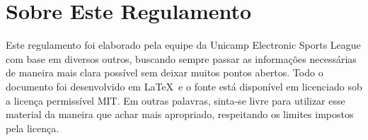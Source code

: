 \section{Sobre Este Regulamento}

Este regulamento foi elaborado pela equipe da Unicamp Electronic Sports League com base em diversos outros, buscando sempre passar as informações necessárias de maneira mais clara possível sem deixar muitos pontos abertos. Todo o documento foi desenvolvido em \LaTeX\ e o fonte está disponível em  licenciado sob a licença permissível MIT. Em outras palavras, sinta-se livre para utilizar esse material da maneira que achar mais apropriado, respeitando os limites impostos pela licença.

